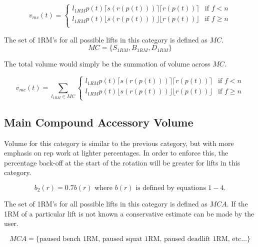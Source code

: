 \begin{equation*}
    v_{mc}(t) = 
    \begin{cases}
        l_{1RM}p(t)\lceil s(r(p(t)))\rceil \lceil r(p(t))\rceil & \text{if $f<n$} \\
        l_{1RM}p(t)\lfloor s(r(p(t)))\rfloor \lfloor r(p(t))\rfloor & \text{if $f\ge n$} \\
    \end{cases} 
\end{equation*}

The set of 1RM's for all possible lifts in this category is defined as $MC$.
\begin{equation}
    MC=\{S_{1RM},B_{1RM},D_{1RM}\}
\end{equation}

The total volume would simply be the summation of volume across $MC$.

\begin{equation}
    v_{mc}(t) = 
    \sum_{l_{1RM}\in MC}
    \begin{cases}
        l_{1RM}p(t)\lceil s(r(p(t)))\rceil \lceil r(p(t))\rceil & \text{if $f<n$} \\
        l_{1RM}p(t)\lfloor s(r(p(t)))\rfloor \lfloor r(p(t))\rfloor & \text{if $f\ge n$} \\
    \end{cases} 
\end{equation}


\subsection{Main Compound Accessory Volume}

Volume for this category is similar to the previous category, but with more emphasis on rep work at lighter percentages. In order to enforce this, the percentage back-off at the start of the rotation will be greater for lifts in this category.

\begin{equation}
    b_2(r)=0.7b(r) \text{ where $b(r)$ is defined by equations $1-4$.}
\end{equation}

The set of 1RM's for all possible lifts in this category is defined as $MCA$. If the 1RM of a particular lift is not known a conservative estimate can be made by the user.

\begin{equation}
    MCA=\{\text{paused bench 1RM, paused squat 1RM, paused deadlift 1RM, etc}\dots\}
\end{equation}

